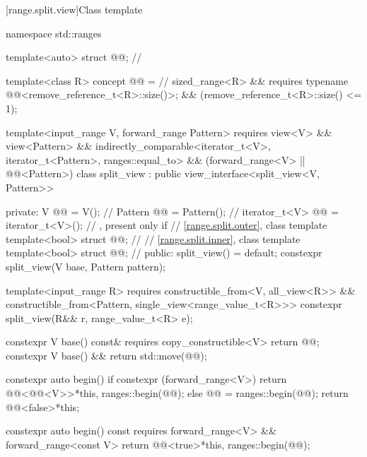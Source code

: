 [range.split.view]{Class template }

%
%
%
%
\begin{codeblock}
namespace std::ranges {
  template<auto> struct @@;       // \expos

  template<class R>
  concept @@ =                          // \expos
    sized_range<R> &&
    requires { typename @@<remove_reference_t<R>::size()>; } &&
    (remove_reference_t<R>::size() <= 1);

  template<input_range V, forward_range Pattern>
    requires view<V> && view<Pattern> &&
             indirectly_comparable<iterator_t<V>, iterator_t<Pattern>, ranges::equal_to> &&
             (forward_range<V> || @@<Pattern>)
  class split_view : public view_interface<split_view<V, Pattern>> {
  private:
    V @@ = V();                              // \expos
    Pattern @@ = Pattern();               // \expos
    iterator_t<V> @@ = iterator_t<V>();   // \expos, present only if 
    // \ref{range.split.outer}, class template 
    template<bool> struct @@;       // \expos
    // \ref{range.split.inner}, class template 
    template<bool> struct @@;       // \expos
  public:
    split_view() = default;
    constexpr split_view(V base, Pattern pattern);

    template<input_range R>
      requires constructible_from<V, all_view<R>> &&
               constructible_from<Pattern, single_view<range_value_t<R>>>
    constexpr split_view(R&& r, range_value_t<R> e);

    constexpr V base() const& requires copy_constructible<V> { return @@; }
    constexpr V base() && { return std::move(@@); }

    constexpr auto begin() {
      if constexpr (forward_range<V>)
        return @@<@@<V>>{*this, ranges::begin(@@)};
      else {
        @@ = ranges::begin(@@);
        return @@<false>{*this};
      }
    }

    constexpr auto begin() const requires forward_range<V> && forward_range<const V> {
      return @@<true>{*this, ranges::begin(@@)};
    }

}}
\end{codeblock}
